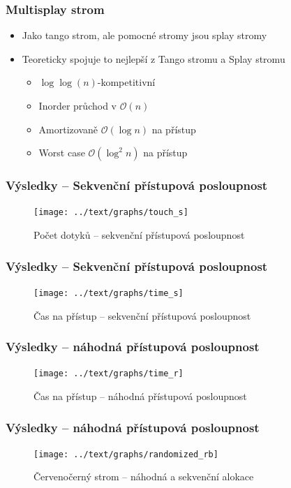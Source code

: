 \documentclass{beamer}
\begin{document}
\begin{frame}
\frametitle{Multisplay strom}
\begin{itemize}
\item Jako tango strom, ale pomocné stromy jsou splay stromy
\item Teoreticky spojuje to nejlepší z Tango stromu a Splay stromu
\begin{itemize}
\item $\log\log(n)$-kompetitivní
\item Inorder průchod v $\mathcal O(n)$
\item Amortizovaně $\mathcal O(\log n)$ na přístup
\item Worst case $\mathcal O(\log^2 n)$ na přístup
\end{itemize}
\end{itemize}
\end{frame}

\begin{frame}
\frametitle{Výsledky -- Sekvenční přístupová posloupnost}
\begin{figure}[h!]
  \centering
  \texttt{[image: ../text/graphs/touch\_s]}
\caption{Počet dotyků -- sekvenční přístupová posloupnost} 
\end{figure}
\end{frame}

\begin{frame}
\frametitle{Výsledky -- Sekvenční přístupová posloupnost}
\begin{figure}[h!]
  \centering
  \texttt{[image: ../text/graphs/time\_s]}
\caption{Čas na přístup -- sekvenční přístupová posloupnost} 
\end{figure}
\end{frame}

\begin{frame}
\frametitle{Výsledky -- náhodná přístupová posloupnost}
\begin{figure}[h!]
  \centering
  \texttt{[image: ../text/graphs/time\_r]}
\caption{Čas na přístup -- náhodná přístupová posloupnost} 
\end{figure}
\end{frame}

\begin{frame}
\frametitle{Výsledky -- náhodná přístupová posloupnost}
\begin{figure}[h!]
  \centering
  \texttt{[image: ../text/graphs/randomized\_rb]}
\caption{Červenočerný strom -- náhodná a sekvenční alokace} 
\end{figure}
\end{frame}
\end{document}
